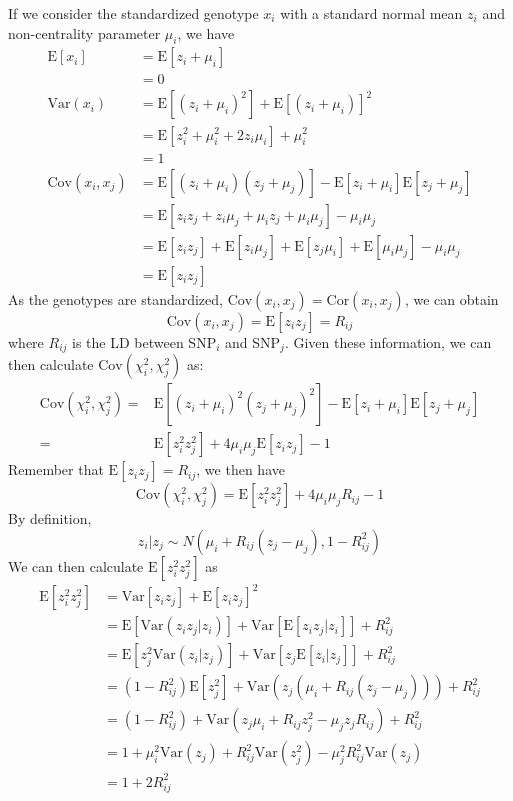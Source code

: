 			If we consider the standardized genotype $x_i$ with a standard normal mean $z_i$ and non-centrality parameter $\mu_i$, we have
			\begin{align*}
				\mathrm{E}[x_i]&=\mathrm{E}[z_i+\mu_i]\\
				&=0\\
				\mathrm{Var}(x_i) &=\mathrm{E}[(z_i+\mu_i)^2]+\mathrm{E}[(z_i+\mu_i)]^2\\
				&=\mathrm{E}[z_i^2+\mu_i^2+2z_i\mu_i]+\mu_i^2\\
				&=1 \\
				\mathrm{Cov}(x_i,x_j)&=\mathrm{E}[(z_i+\mu_i)(z_j+\mu_j)]-\mathrm{E}[z_i+\mu_i]\mathrm{E}[z_j+\mu_j]\\
				&=\mathrm{E}[z_iz_j+z_i\mu_j+\mu_iz_j+\mu_i\mu_j]-\mu_i\mu_j\\
				&=\mathrm{E}[z_iz_j]+\mathrm{E}[z_i\mu_j]+\mathrm{E}[z_j\mu_i]+\mathrm{E}[\mu_i\mu_j]-\mu_i\mu_j\\
				&=\mathrm{E}[z_iz_j]
			\end{align*}
			As the genotypes are standardized, $\mathrm{Cov}(x_i,x_j)=\mathrm{Cor}(x_i,x_j)$, we can obtain
			$$
				\mathrm{Cov}(x_i,x_j)=\mathrm{E}[z_iz_j]=R_{ij}
			$$
			where $R_{ij}$ is the \gls{LD} between \gls{SNP}$_i$ and \gls{SNP}$_j$.
			Given these information, we can then calculate $\mathrm{Cov}(\chi_i^2,\chi_j^2)$ as:
			\begin{align*}
				\mathrm{Cov}(\chi_i^2,\chi_j^2)=&\mathrm{E}[(z_i+\mu_i)^2(z_j+\mu_j)^2]-\mathrm{E}[z_i+\mu_i]\mathrm{E}[z_j+\mu_j]\\
				=&\mathrm{E}[z_i^2z_j^2]+4\mu_i\mu_j\mathrm{E}[z_iz_j]-1
			\end{align*}
			Remember that $\mathrm{E}[z_iz_j] = R_{ij}$, we then have
			$$
				\mathrm{Cov}(\chi_i^2, \chi_j^2)=\mathrm{E}[z_i^2z_j^2]+4\mu_i\mu_jR_{ij}-1
			$$
			By definition, 
			$$
				z_i|z_j\sim N(\mu_i+R_{ij}(z_j-\mu_j),1-R_{ij}^2)
			$$
			We can then calculate $\mathrm{E}[z_i^2z_j^2]$ as
			\begin{align*}
				\mathrm{E}[z_i^2z_j^2]&=\mathrm{Var}[z_iz_j]+\mathrm{E}[z_iz_j]^2\\
				&=\mathrm{E}[\mathrm{Var}(z_iz_j|z_i)]+\mathrm{Var}[\mathrm{E}[z_iz_j|z_i]]+R_{ij}^2\\
				&=\mathrm{E}[z_j^2\mathrm{Var}(z_i|z_j)]+\mathrm{Var}[z_j\mathrm{E}[z_i|z_j]]+R_{ij}^2\\
				&=(1-R_{ij}^2)\mathrm{E}[z_j^2]+\mathrm{Var}(z_j(\mu_i+R_{ij}(z_j-\mu_j)))+R_{ij}^2\\
				&=(1-R_{ij}^2)+\mathrm{Var}(z_j\mu_i+R_{ij}z_j^2-\mu_jz_jR_{ij})+R_{ij}^2\\
				&=1+\mu_i^2\mathrm{Var}(z_j)+R_{ij}^2\mathrm{Var}(z_j^2)-\mu_j^2R_{ij}^2\mathrm{Var}(z_j)\\
				&=1+2R_{ij}^2
			\end{align*}
